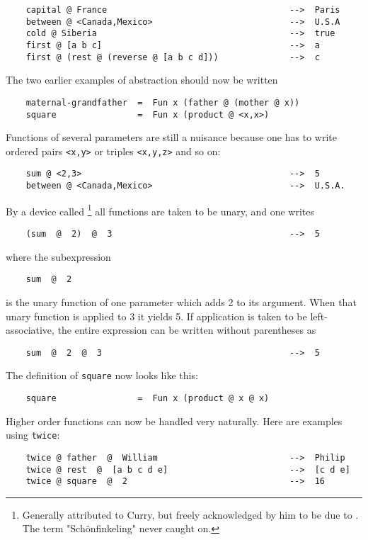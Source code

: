 \begin{verbatim}
    capital @ France                                    -->  Paris
    between @ <Canada,Mexico>                           -->  U.S.A
    cold @ Siberia                                      -->  true
    first @ [a b c]                                     -->  a
    first @ (rest @ (reverse @ [a b c d]))              -->  c
\end{verbatim}
The two earlier examples of abstraction should now be written
\begin{verbatim}
    maternal-grandfather  =  Fun x (father @ (mother @ x))
    square                =  Fun x (product @ <x,x>)
\end{verbatim}
\par
Functions of several parameters are still a nuisance because
one has to write ordered pairs \verb#<x,y># or triples \verb#<x,y,z>#
and so on:
\begin{verbatim}
    sum @ <2,3>                                         -->  5
    between @ <Canada,Mexico>                           -->  U.S.A.
\end{verbatim}
By a device called \footnote{
Generally attributed to Curry, but freely acknowledged by
him to be due to .
The term "Sch\"{o}nfinkeling" never caught on.
}
all functions are taken to be unary, and one writes
\begin{verbatim}
    (sum  @  2)  @  3                                   -->  5
\end{verbatim}
where the subexpression
\begin{verbatim}
    sum  @  2
\end{verbatim}
is the  unary function of one parameter which adds 2 to its
argument.
When that unary function is applied to 3 it yields 5.
If application is taken to be left-associative,
the entire expression can be written without parentheses as
\begin{verbatim}
    sum  @  2  @  3                                     -->  5
\end{verbatim}
The definition of \verb#square# now looks like this:
\begin{verbatim}
    square                =  Fun x (product @ x @ x)
\end{verbatim}
\par
Higher order functions can now be handled very naturally.
Here are examples using \verb#twice#:
\begin{verbatim}
    twice @ father  @  William                          -->  Philip
    twice @ rest  @  [a b c d e]                        -->  [c d e]
    twice @ square  @  2                                -->  16
\end{verbatim}
